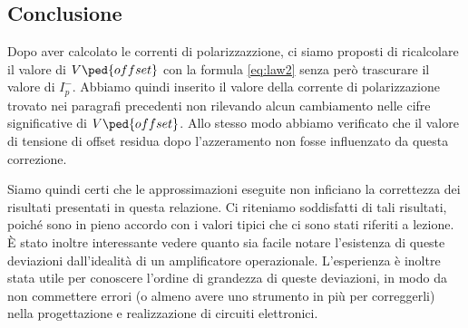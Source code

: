 \subsection{Conclusione}

Dopo aver calcolato le correnti di polarizzazzione, ci siamo proposti di ricalcolare
il valore di $V\ped{offset}$ con la formula \eqref{eq:law2} senza però trascurare il valore di
$I_p^-$. Abbiamo quindi inserito il valore della corrente di polarizzazione trovato nei
paragrafi precedenti non rilevando alcun cambiamento nelle cifre significative
di $V\ped{offset}$. Allo stesso modo abbiamo verificato che il valore di tensione di offset residua
dopo l'azzeramento non fosse influenzato da questa correzione.

Siamo quindi certi che le approssimazioni eseguite non inficiano la correttezza dei
risultati presentati in questa relazione. Ci riteniamo soddisfatti di tali risultati, poiché
sono in pieno accordo con i valori tipici che ci sono stati riferiti a lezione.
È stato inoltre interessante vedere quanto sia facile notare l'esistenza di queste deviazioni dall'idealità
di un amplificatore operazionale. L'esperienza è inoltre stata utile per conoscere l'ordine di grandezza di queste
deviazioni, in modo da non commettere errori (o almeno avere uno strumento in più per correggerli)
nella progettazione e realizzazione di circuiti elettronici.
